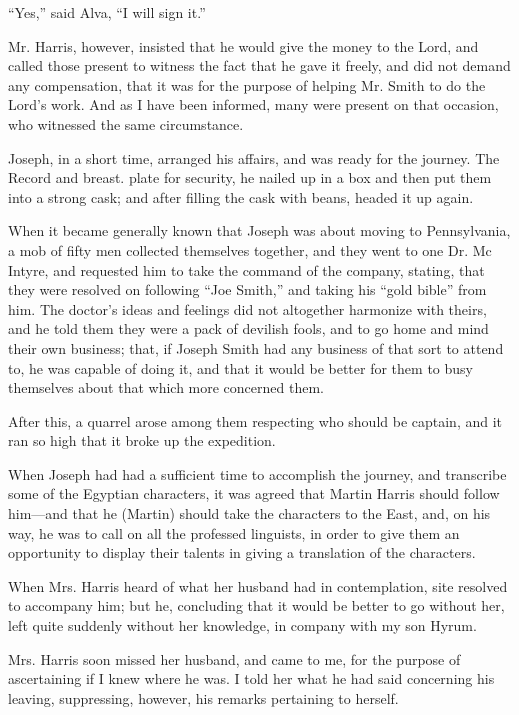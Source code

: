 		``Yes,'' said Alva, ``I will sign it.''

		Mr. Harris, however, insisted that he would give the money to the Lord, and called those present to witness the fact that he gave it freely, and did not demand any compensation, that it was for the purpose of helping Mr. Smith to do the Lord's work. And as I have been informed, many were present on that occasion, who witnessed the same circumstance.

		Joseph, in a short time, arranged his affairs, and was ready for the journey. The Record and breast. plate for security, he nailed up in a box and then put them into a strong cask; and after filling the cask with beans, headed it up again.

		When it became generally known that Joseph was about moving to Pennsylvania, a mob of fifty men collected themselves together, and they went to one Dr. Mc Intyre, and requested him to take the command of the company, stating, that they were resolved on following ``Joe Smith,'' and taking his ``gold bible'' from him. The doctor's ideas and feelings did not altogether harmonize with theirs, and he told them they were a pack of devilish fools, and to go home and mind their own business; that, if Joseph Smith had any business of that sort to attend to, he was capable of doing it, and that it would be better for them to busy themselves about that which more concerned them.

		After this, a quarrel arose among them respecting who should be captain, and it ran so high that it broke up the expedition.

		When Joseph had had a sufficient time to accomplish the journey, and transcribe some of the Egyptian characters, it was agreed that Martin Harris should follow him---and that he (Martin) should take the characters to the East, and, on his way, he was to call on all the professed linguists, in order to give them an opportunity to display their talents in giving a translation of the characters.

		When Mrs. Harris heard of what her husband had in contemplation, site resolved to accompany him; but he, concluding that it would be better to go without her, left quite suddenly without her knowledge, in company with my son Hyrum.

		Mrs. Harris soon missed her husband, and came to me, for the purpose of ascertaining if I knew where he was. I told her what he had said concerning his leaving, suppressing, however, his remarks pertaining to herself.

